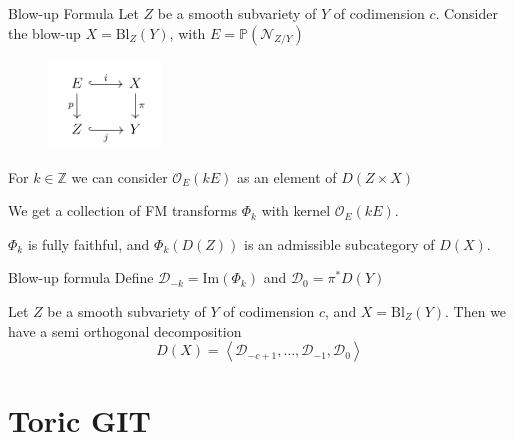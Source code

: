 \documentclass{beamer}
\begin{document}
\begin{frame}{Blow-up Formula}
Let  $Z$ be a smooth subvariety of $Y$ of codimension $c$. Consider the blow-up $X = \mathrm{Bl}_{Z}(Y)$,  with $E = \mathbb{P} (\mathcal{N}_{Z/Y})$

\begin{figure}[!h]
    \centering
    \includegraphics[width = 3cm]{blow up.png}
\end{figure}
For $k\in \mathbb{Z}$ we can consider $\mathcal{O}_{E}(kE)$ as an element of $D(Z\times X)$
\vspace{0.3cm}

We get a collection of FM transforms $\Phi_k$ with kernel $ \mathcal{O}_{E}(kE)$.
\vspace{0.3cm}

$\Phi_{k}$ is fully faithful, and $\Phi_{k} (D(Z))$ is an admissible subcategory of $D(X)$. 

\end{frame}

\begin{frame}{Blow-up formula}
    Define  $\mathcal{D}_{-k}=\mathrm{Im}(\Phi_{k})$ and $\mathcal{D}_{0}= \pi^{*}D(Y)$ 
\begin{theorem}
    Let $Z$ be a smooth subvariety of $Y$ of codimension $c$, and $X = \mathrm{Bl}_{Z}(Y)$. Then we have a semi orthogonal decomposition $$D(X) = \left< \mathcal{D}_{-c+1},\dots,\mathcal{D}_{-1}, \mathcal{D}_0 \right> $$
\end{theorem}
\end{frame}

\section{Toric GIT}
\end{document}
